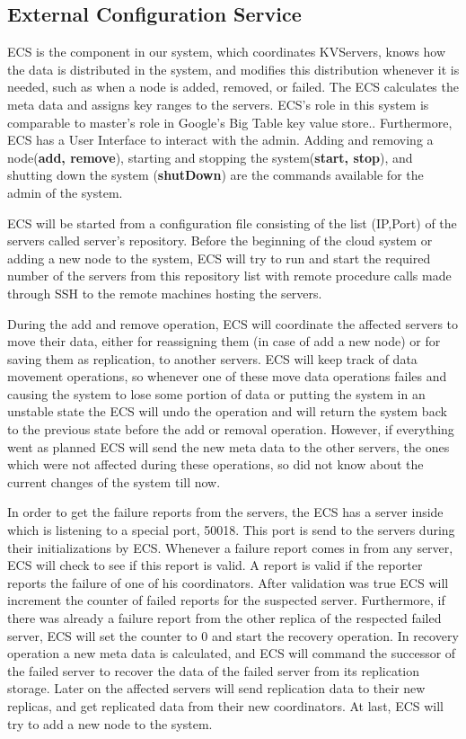 \documentclass{sig-alternate}
\begin{document}
\subsection{External Configuration Service}
ECS is the component in our system, which coordinates KVServers, knows how the data is distributed in the system, and modifies this distribution whenever it is needed, such as when a node is added, removed, or failed. The ECS calculates the meta data and assigns key ranges to the servers. ECS's role in this system is comparable to master's role in Google's Big Table key value store.\cite{bigTable}. Furthermore, ECS has a User Interface to interact with the admin. Adding and removing a node(\textbf{add, remove}), starting and stopping the system(\textbf{start, stop}), and shutting down the system (\textbf{shutDown}) are the commands available for the admin of the system.

ECS will be started from a configuration file consisting of the list (IP,Port) of the servers called server's repository. Before the beginning of the cloud system or adding a new node to the system, ECS will try to run and start the required number of the servers from this repository list with  remote procedure calls made through SSH to the remote machines hosting the servers. 

During the add and remove operation, ECS will coordinate the affected servers to move their data, either for reassigning them (in case of add a new node) or for saving them as replication, to another servers. ECS will keep track of data movement operations, so whenever one of these move data operations failes and causing the system to lose some portion of data or putting the system in an unstable state the ECS will undo the operation and will return the system back to the previous state before the add  or removal operation. However, if everything went as planned ECS will send the new meta data to the other servers, the ones which were not affected during these operations, so did not know about the current changes of the system till now.

In order to get the failure reports from the servers, the ECS has a server inside which is listening to a special port, 50018. This port is send to the servers during their initializations by ECS. Whenever a failure report comes in from any server, ECS will check to see if this report is valid. A report is valid if the reporter reports the failure of one of his coordinators. After validation was true ECS will increment the counter of failed reports for the suspected server. Furthermore, if there was already a failure report from the other replica of the respected failed server, ECS will set the counter to 0 and start the recovery operation. In recovery operation a new meta data is calculated, and ECS will command the successor of the failed server to recover the data of the failed server from its replication storage. Later on the affected servers will send replication data to their new replicas, and get replicated data from their new coordinators. At last, ECS will try to add a new node to the system.
\end{document}
